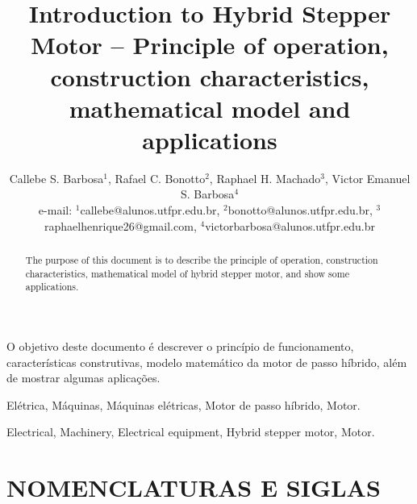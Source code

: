 \usepackage{float}


\title{Introduction to Hybrid Stepper Motor -- Principle of operation, construction characteristics, mathematical model and applications}

\author{Callebe S. Barbosa$^{1}$, Rafael C. Bonotto$^{2}$, Raphael H. Machado$^{3}$, Victor Emanuel S. Barbosa$^{4}$\\
	\normalsize e-mail: $^{1}$callebe@alunos.utfpr.edu.br, $^{2}$bonotto@alunos.utfpr.edu.br, 
	$^{3}$raphaelhenrique26@gmail.com, $^{4}$victorbarbosa@alunos.utfpr.edu.br
}



\maketitle

\begin{resumo}
	O objetivo deste documento é descrever o princípio de funcionamento, características construtivas, modelo matemático da motor de passo híbrido, além de mostrar algumas aplicações.
\end{resumo}

\begin{palavraschave}
	Elétrica, Máquinas, Máquinas elétricas, Motor de passo híbrido, Motor.
\end{palavraschave}

\englishtitle

\begin{abstract}
	The purpose of this document is to describe the principle of operation, construction characteristics, mathematical model of hybrid stepper motor, and show some applications.
\end{abstract}

\begin{keywords}
	Electrical, Machinery, Electrical equipment, Hybrid stepper motor, Motor.
\end{keywords}

\section*{NOMENCLATURAS E SIGLAS}

